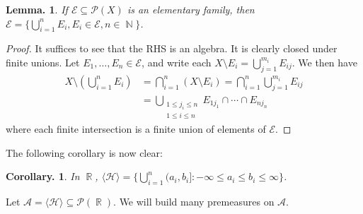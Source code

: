 \documentclass[11pt, a4paper]{memoir}
\DeclareMathOperator{\N}{{\mathbb{N}}}
\DeclareMathOperator{\R}{{\mathbb{R}}}
\theoremstyle{change}
\newtheorem{lemma}[theorem]{Lemma.}
\newtheorem{corollary}[theorem]{Corollary.}
\theoremstyle{plain}
\theoremstyle{nonumberplain}
\newtheorem{proof}{Proof}
\numberwithin{equation}{section}
\begin{document}
\begin{lemma}
    If $\mathcal{E}\subseteq\mathcal{P}(X)$ is an elementary family, then $\mathcal{E}=\{\bigcup_{i=1}^n E_i,E_i\in\mathcal{E},n\in\N\}$.
\end{lemma}
\begin{proof}
    It suffices to see that the RHS is an algebra.
    It is clearly closed under finite unions.
    Let $E_1,\ldots,E_n\in\mathcal{E}$, and write each $X\setminus E_i=\bigcup_{j=1}^{m_i} E_{ij}$.
    We then have
    \begin{align*}
        X\setminus\left(\bigcup_{i=1}^n E_i\right)&=\bigcap_{i=1}^n(X\setminus E_i)=\bigcap_{i=1}^n\bigcup_{j=1}^{m_i} E_{ij}\\
                                                  &=\bigcup_{\substack{1\leq j_i\leq n\\1\leq i\leq n}}E_{1j_1}\cap\cdots\cap E_{nj_n}
    \end{align*}
    where each finite intersection is a finite union of elements of $\mathcal{E}$.
\end{proof}
The following corollary is now clear:
\begin{corollary}
    In $\R$, $\langle\mathcal{H}\rangle=\bigl\{\bigcup_{i=1}^n (a_i,b_i]:-\infty\leq a_i\leq b_i\leq\infty\bigr\}$. %
\end{corollary}
Let $\mathcal{A}=\langle \mathcal{H}\rangle\subseteq\mathcal{P}(\R)$.
We will build many premeasures on $\mathcal{A}$.
\end{document}
